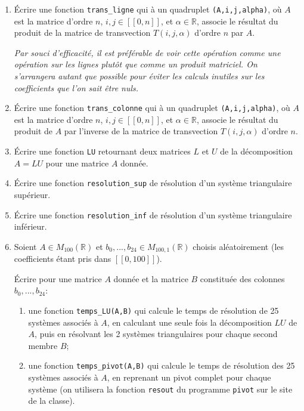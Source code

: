 \begin{enumerate}
	
	\item \'Ecrire une fonction \texttt{trans\_ligne} qui à un quadruplet \texttt{(A,i,j,alpha)}, où $A$ est la matrice d'ordre $n$, $i,j\in [\![0,n]\!]$, et $\alpha\in \mathbb{R}$, associe le résultat du produit de la matrice de transvection $T(i,j,\alpha)$ d'ordre $n$ par $A$.
	
	\it Par souci d'efficacité, il est préférable de voir cette opération comme une opération sur les lignes plutôt que comme un produit matriciel. On s'arrangera autant que possible pour éviter les calculs inutiles sur les coefficients que l'on sait être nuls.\rm
	
	\item \'Ecrire une fonction \texttt{trans\_colonne} qui à un quadruplet \texttt{(A,i,j,alpha)}, où $A$ est la matrice d'ordre $n$, $i,j\in [\![0,n]\!]$, et $\alpha\in \mathbb{R}$, associe le résultat du produit de $A$ par l'inverse de la matrice de transvection $T(i,j,\alpha)$ d'ordre $n$.
	
	\item \'Ecrire une fonction \texttt{LU} retournant deux matrices $L$ et $U$ de la décomposition $A=LU$ pour une matrice $A$ donnée.
	
	\item \'Ecrire une fonction \texttt{resolution\_sup} de résolution d'un système triangulaire supérieur.
	
	\item \'Ecrire une fonction \texttt{resolution\_inf} de résolution d'un système triangulaire inférieur.
	
	\item Soient $A\in M_{100}(\mathbb{R})$ et $b_0,...,b_{24}\in M_{100,1}(\mathbb{R})$ choisis aléatoirement (les coefficients étant pris dans $[\![0,100]\!]$).
	
	\'Ecrire pour une matrice $A$ donnée et la matrice $B$ constituée des colonnes $b_0,...,b_{24}$:
	
	\begin{enumerate}
		
		\item une fonction \texttt{temps\_LU(A,B)} qui calcule le temps de résolution de 25 systèmes associés à $A$, en calculant une seule fois la décomposition $LU$ de $A$, puis en résolvant les 2 systèmes triangulaires pour chaque second membre $B$;
		
		\item une fonction \texttt{temps\_pivot(A,B)} qui calcule le temps de résolution des 25 systèmes associés à $A$, en reprenant un pivot complet pour chaque système (on utilisera la fonction \texttt{resout} du programme \texttt{pivot} sur le site de la classe).
		

\end{enumerate}
\end{enumerate}
